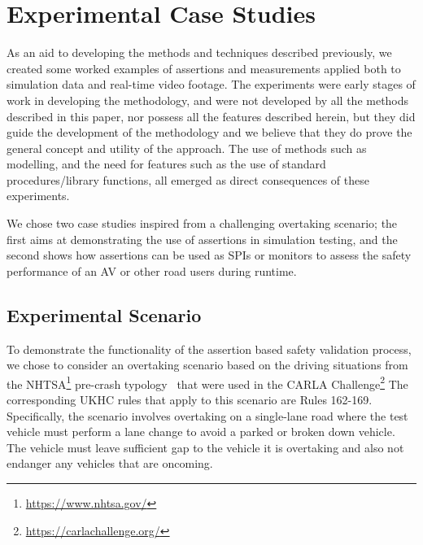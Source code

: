 \section{Experimental Case Studies} \label{Experimental_scenario}
As an aid to developing the methods and techniques described previously, we created some worked examples of assertions and measurements applied both to simulation data and real-time video footage. The experiments were early stages of work in developing the methodology, and were not developed by all the methods described in this paper, nor possess all the features described herein, but they did guide the development of the methodology and we believe that they do prove the general concept and utility of the approach. The use of methods such as modelling, and the need for features such as the use of standard procedures/library functions, all emerged as direct consequences of these experiments.

We chose two case studies inspired from a challenging overtaking scenario; the first aims at demonstrating the use of assertions in simulation testing, and the second shows how assertions can be used as SPIs or monitors to assess the safety performance of an AV or other road users during runtime.

\subsection{Experimental Scenario} %
\label{carla_challenge}
To demonstrate the functionality of the assertion based safety validation process, we chose to consider an overtaking scenario based on the driving situations from the NHTSA\footnote{\url{https://www.nhtsa.gov/}} pre-crash typology~\cite{nhtsa_precrash} that were used in the CARLA Challenge\footnote{\url{https://carlachallenge.org/}} The corresponding UKHC rules \cite{highwayCode} that apply to this scenario are Rules 162-169. Specifically, the scenario involves overtaking on a single-lane road where the test vehicle must perform a lane change to avoid a parked or broken down vehicle. 
The vehicle must leave sufficient gap to the vehicle it is overtaking and also not endanger any vehicles that are oncoming.



